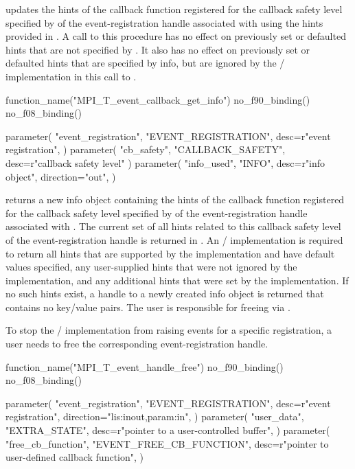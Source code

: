  updates the hints of the
callback function registered for the callback safety level specified by
 of the event-registration handle associated with
 using the hints provided in .
A call to this procedure has no effect on previously set or defaulted hints that are
not specified by . It also has no effect on previously set or
defaulted hints that are specified by info, but are ignored by the \MPI/
implementation in this call to
.

\begin{mpi-binding}
    function_name("MPI_T_event_callback_get_info")
    no_f90_binding()
    no_f08_binding()

    parameter(
        "event_registration",
        "EVENT_REGISTRATION",
        desc=r"event registration",
    )
    parameter(
        "cb_safety",
        "CALLBACK_SAFETY",
        desc=r"callback safety level"
    )
    parameter(
        "info_used",
        "INFO",
        desc=r"info object",
        direction="out",
    )
\end{mpi-binding}

 returns a new info object
containing the hints of the callback function registered for the callback
safety level specified by  of the event-registration
handle associated with .  The current set
of all hints related to this callback safety level of the
event-registration handle is returned in .
An \MPI/ implementation is required to return all hints that are supported
by the implementation and have default values specified, any user-supplied
hints that were not ignored by the implementation, and any additional hints
that were set by the implementation.  If no such hints exist, a handle to a
newly created info object is returned that contains no key/value pairs.
The user is responsible for freeing  via
.


To stop the \MPI/ implementation from raising events for a specific
registration, a user needs to free the corresponding event-registration
handle.

\begin{mpi-binding}
    function_name("MPI_T_event_handle_free")
    no_f90_binding()
    no_f08_binding()

    parameter(
        "event_registration",
        "EVENT_REGISTRATION",
        desc=r"event registration",
        direction="lis:inout,param:in",
    )
    parameter(
        "user_data",
        "EXTRA_STATE",
        desc=r"pointer to a user-controlled buffer",
    )
    parameter(
        "free_cb_function",
        "EVENT_FREE_CB_FUNCTION",
        desc=r"pointer to user-defined callback function",
    )
\end{mpi-binding}


